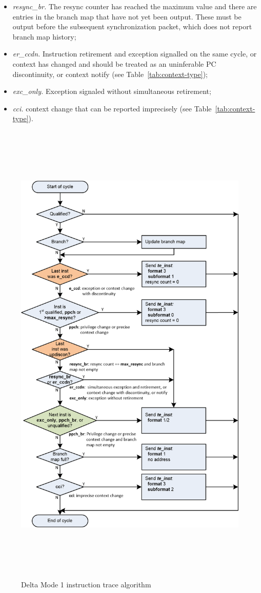 \begin{itemize}
   \item \textit{resync\_br.} The resync counter has reached the maximum value and there are
     entries in the branch map that have not yet been output.  These must be output before
     the subsequent synchronization packet, which does not report branch map history;
   \item \textit{er\_ccdn.}  Instruction retirement and exception signalled on the same cycle, 
     or context has changed and should be treated as an uninferable PC discontinuity, or
     context notify (see Table~\ref{tab:context-type});
   \item \textit{exc\_only.}  Exception signaled without simultaneous retirement;
   \item \textit{cci.}  context change that can be reported imprecisely (see Table~\ref{tab:context-type}).
\end{itemize}

\begin{figure}[l]
\begin{center}
  \includegraphics[height=23cm, width=15cm]{algo.png}
  \caption{Delta Mode 1 instruction trace algorithm}
  \label{fig:algo}
\end{center}
\end{figure}

